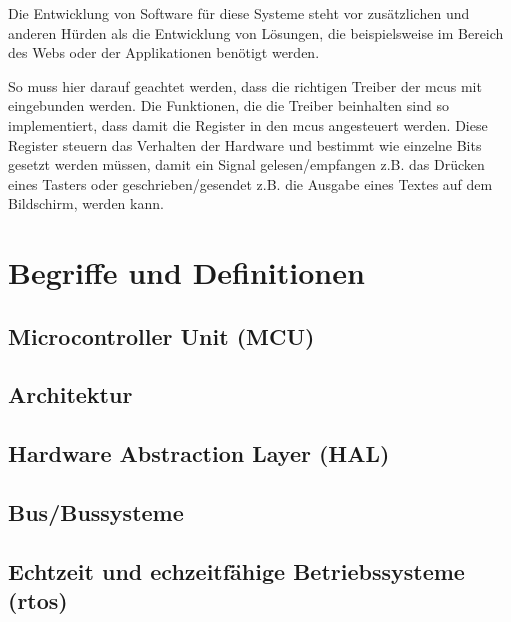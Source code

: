 \vspace{6 mm}

Die Entwicklung von Software für diese Systeme steht vor zusätzlichen und anderen Hürden als die Entwicklung von Lösungen, die beispielsweise im Bereich des Webs oder der Applikationen benötigt werden.

So muss hier darauf geachtet werden, dass die richtigen Treiber der \gls{mcu}s mit eingebunden werden. 
Die Funktionen, die die Treiber beinhalten sind so implementiert, dass damit die Register in den \gls{mcu}s angesteuert werden.
Diese Register steuern das Verhalten der Hardware und bestimmt wie einzelne Bits gesetzt werden müssen, damit ein Signal gelesen/empfangen z.B. das Drücken eines Tasters oder geschrieben/gesendet z.B. die Ausgabe eines Textes auf dem Bildschirm, werden kann.



\section{Begriffe und Definitionen}



\subsection*{Microcontroller Unit (MCU)}

\subsection*{Architektur}

\subsection*{Hardware Abstraction Layer (HAL)}

\subsection*{Bus/Bussysteme}

\subsection*{Echtzeit und echzeitfähige Betriebssysteme (\gls{rtos})}

